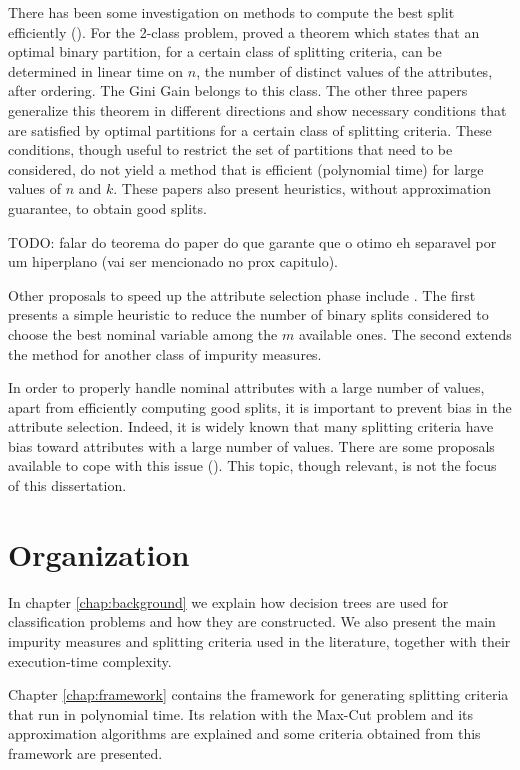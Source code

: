 There has been  some investigation on 
methods to compute the best split efficiently 
(\cite{Breiman84,Chou:91,BPKN:92,journals/datamine/CoppersmithHH99}).
For the 2-class problem,  \cite{Breiman84} proved a theorem which states that an optimal
binary partition, for a certain class of splitting criteria,
can be determined in linear time on $n$, the number of distinct values of the attributes, after ordering.
The Gini  Gain belongs to this class.
The  other  three papers generalize
this theorem  in different directions 
and show necessary conditions that are satisfied by optimal partitions for a certain class of splitting criteria. 
These conditions, though useful to restrict the set of partitions
that need to be considered, do not yield  a method that
is efficient (polynomial time) for large values of $n$ and $k$. These papers also  present  heuristics, without approximation guarantee, to obtain good splits.

TODO: falar do teorema do paper do \cite{journals/datamine/CoppersmithHH99} que garante que o otimo eh separavel por um hiperplano (vai ser mencionado no prox capitulo).

Other proposals to  speed up the attribute selection phase
 include  \cite{MolaSiciliano1997,Shih2001}. 
The first presents a simple  heuristic
to reduce the number of binary splits considered to
choose the best nominal variable among the $m$ available ones.
 The second   extends the method for another class
of impurity measures.

In order to properly
handle nominal attributes with a large number of values,
apart from efficiently computing good splits, it is
important to prevent bias in the attribute selection.
Indeed, it is widely  known that many splitting criteria have bias toward
attributes with a large number of values. There are some  proposals available
to cope with this issue 
(\cite{conf/icml/DobraG01,Shih2004,Hothorn:2006:URP}). 
This topic, though relevant, is not the focus of this dissertation.

\section{Organization}
\label{sec:organization}
In chapter \ref{chap:background} we explain how decision trees are used for classification problems and how they are constructed. We also present the main impurity measures and splitting criteria used in the literature, together with their execution-time complexity.

Chapter \ref{chap:framework} contains the framework for generating splitting criteria that run in polynomial time. Its relation with the Max-Cut problem and its approximation algorithms are explained and some criteria obtained from this framework are presented.

